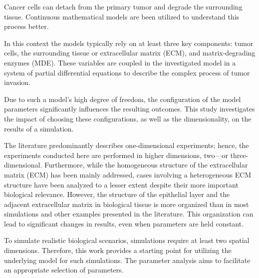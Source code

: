 Cancer cells can detach from the primary tumor and degrade the surrounding tissue. 
Continuous mathematical models are been utilized to understand this process better.

In this context the models typically rely on at least three key components: tumor cells, the surrounding tissue or extracellular matrix (ECM), and matrix-degrading enzymes (MDE). These variables are coupled in the investigated model in a  system of partial differential equations to describe the complex process of tumor invasion.

Due to such a model's high degree of freedom, the configuration of the model parameters significantly influences the resulting outcomes. This study investigates the impact of choosing these configurations, as well as the dimensionality, on the results of a simulation.

The literature predominantly describes one-dimensional experiments; hence, the experiments conducted here are performed in higher dimensions, two—or three-dimensional. Furthermore, while the homogeneous structure of the extracellular matrix (ECM) has been mainly addressed, cases involving a heterogeneous ECM structure have been analyzed to a lesser extent despite their more important biological relevance. However, the structure of the epithelial layer and the adjacent extracellular matrix in biological tissue is more organized than in most simulations and other examples presented in the literature. This organization can lead to significant changes in results, even when parameters are held constant.

To simulate realistic biological scenarios, simulations require at least two spatial dimensions. Therefore, this work provides a starting point for utilizing the underlying model for such simulations. The parameter analysis aims to facilitate an appropriate selection of parameters.
